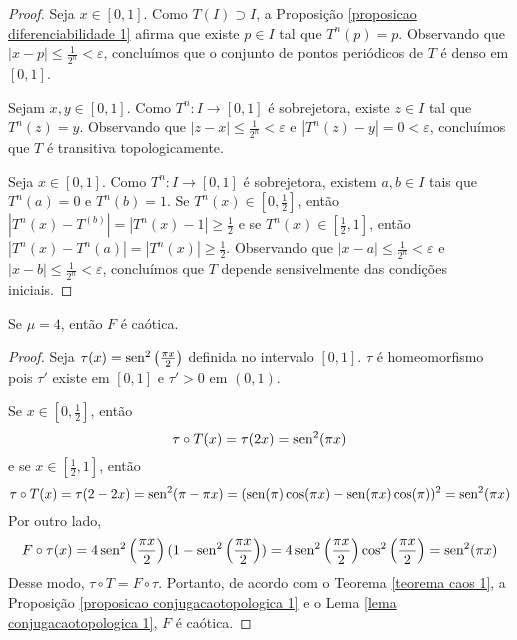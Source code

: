 \begin{proof}
Seja $x \in [0,1]$. Como $T(I) \supset I$, a Proposição \ref{proposicao diferenciabilidade 1} afirma que existe $p \in I$ tal que $T^n(p) = p$. Observando que $|x-p| \leq \frac{1}{2^n} < \varepsilon$, concluímos que o conjunto de pontos periódicos de $T$ é denso em $[0,1]$.

Sejam $x, y \in [0,1]$. Como $T^n: I \to [0,1]$ é sobrejetora, existe $z \in I$ tal que $T^n(z) = y$. Observando que $|z - x| \leq \frac{1}{2^n} < \varepsilon$ e $|T^n(z) - y| = 0 < \varepsilon$, concluímos que $T$ é transitiva topologicamente.

Seja $x \in [0,1]$.  Como $T^n: I \to [0,1]$ é sobrejetora, existem $a, b \in I$ tais que $T^n(a) = 0$ e $T^n(b) = 1$. Se $T^n(x) \in [0, \frac{1}{2}]$, então $|T^n(x) - T^(b)| = |T^n(x) - 1| \geq \frac{1}{2}$ e se $T^n(x) \in [\frac{1}{2}, 1]$, então $|T^n(x) - T^n(a)| = |T^n(x)| \geq \frac{1}{2}$. Observando que $|x - a| \leq \frac{1}{2^n} < \varepsilon$ e $|x - b| \leq \frac{1}{2^n} < \varepsilon$, concluímos que $T$ depende sensivelmente das condições iniciais.
\end{proof}

\begin{theorem}
Se $\mu = 4$, então $F$ é caótica.
\end{theorem}

\begin{proof}
Seja $\tau(x) = \operatorname{sen}^2\left(\frac{\pi x}{2}\right)$ definida no intervalo $ [0,1]$. $\tau$ é homeomorfismo pois $\tau'$ existe em $[0,1]$ e $\tau' > 0$ em $(0,1)$.

Se $x \in \left[0, \frac{1}{2}\right]$, então $$\tau \circ T(x) = \tau(2x) = \operatorname{sen}^2(\pi x)$$
e se $x \in \left[\frac{1}{2}, 1\right]$, então $$\tau \circ T(x) = \tau(2 - 2x) = \operatorname{sen}^2(\pi- \pi x) = (\operatorname{sen}(\pi)\cos(\pi x) - \operatorname{sen}(\pi x)\cos(\pi))^2 = \operatorname{sen}^2(\pi x)$$
Por outro lado, $$F \circ \tau(x) = 4\operatorname{sen}^2\left(\frac{\pi x}{2}\right)(1 - \operatorname{sen}^2\left(\frac{\pi x}{2}\right)) = 4\operatorname{sen}^2\left(\frac{\pi x}{2}\right)\cos^2\left(\frac{\pi x}{2}\right) = \operatorname{sen}^2(\pi x)$$
Desse modo, $\tau \circ T = F \circ \tau$. Portanto, de acordo com o Teorema \ref{teorema caos 1}, a Proposição \ref{proposicao conjugacaotopologica 1} e o Lema \ref{lema conjugacaotopologica 1}, $F$ é caótica.
\end{proof}